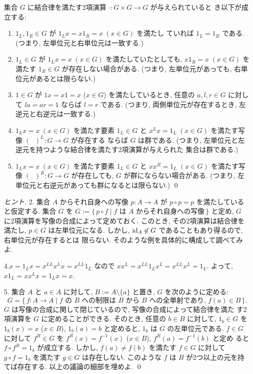 \documentclass[12pt,twoside]{jarticle}
\begin{document}

\begin{question}
  集合 $G$ に結合律を満たす2項演算 $\cdot:G\times G\to G$ が与えられていると
  き以下が成立する:
  \begin{enumerate}
  \item $1_L,1_R\in G$ が $1_Lx = x1_R = x\;(x\in G)$ を満たし
    ていれば $1_L=1_R$ である.  (つまり, 左単位元と右単位元は一致する.)
  \item $1_L\in G$ が $1_Lx = x\;(x\in G)$ を満たしていたとしても,
    $x1_R = x\;(x\in G)$ を満たす $1_R\in G$ が存在しない場合がある.
    (つまり, 左単位元があっても, 右単位元があるとは限らない.)
  \item $1\in G$ が $1x=x1=x$ ($x\in G$) を満たしているとき,
    任意の $a,l,r\in G$ に対して $la=ar=1$ ならば $l=r$ である. 
    (つまり, 両側単位元が存在するとき, 左逆元と右逆元は一致する.)
  \item $1_Lx=x\;(x\in G)$ を満たす要素 $1_L\in G$ と %
    $x^Lx=1_L\;(x\in G)$ を満たす写像 $(\;\;)^L:G\to G$ が存在する
    ならば $G$ は群である.
    (つまり, 左単位元と左逆元を持つような結合律を満たす2項演算が与えられた
    集合は群である.)
  \item $1_Lx=x\;(x\in G)$ を満たす要素 $1_L\in G$ と %
    $xx^R=1_L\;(x\in G)$ を満たす写像 $(\;\;)^R:G\to G$ が存在しても, 
    $G$ が群にならない場合がある.
    (つまり, 左単位元と右逆元があっても群になるとは限らない.)
    \qed
  \end{enumerate}
\end{question}

\begin{proof}[ヒント]
2. 集合 $A$ からそれ自身への写像 $p:A\to A$ が $p\circ p = p$ 
を満たしていると仮定する.  集合 $G$ 
を $G := \{\, p\circ f\mid \text{$f$ は $A$ からそれ自身への写像}\,\}$ と定め, %
$G$ に2項演算を写像の合成によって定めておく. 
このとき, その2項演算は結合律を満たし, $p\in G$ は左単位元になる.
しかし, $\mathop{\mathrm{id}}\nolimits_A\not\in G$ であることもあり得るので, 右単位元が存在するとは
限らない. そのような例を具体的に構成して調べてみよ.

4.$x=1_Lx=x^{LL}x^Lx=x^{LL}1_L$ なので $xx^L=x^{LL}1_Lx^L=x^{LL}x^L=1_L$. 
よって, $x1_L=xx^Lx=1_Lx=x$.

5. 集合 $A$ と $a\in A$ に対して, $B:=A\setminus\{a\}$ と置き,
$G$ を次のように定める:
\begin{equation*}
  G = \{\, f:A\to A \mid
  \text{$f$ の $B$ への制限は $B$ から $B$ への全単射であり, 
        $f(a)\in B$} \,\}.
\end{equation*}
$G$ は写像の合成に関して閉じているので, 写像の合成によって結合律を満た
す2項演算を $G$ に定めることができる.
そのとき, 任意の $b\in B$ に対して, 
$1_b\in G$ を $1_b(x)=x$ ($x\in B$), $1_b(a)=b$ と定めると, 
$1_b$ は $G$ の左単位元である. 
$f\in G$ に対して $f^R\in G$ を %
$f^R(x)=f^{-1}(x)$ ($x\in B$), $f^R(a)=f^{-1}(b)$ と定め
ると $f\circ f^R = 1_b$ が成立する. 
しかし, $f(a)\ne f(b)$ を満たす $f\in G$ に対して %
$g\circ f = 1_b$ を満たす $g\in G$ は存在しない.
このような $f$ は $B$ が2つ以上の元を持てば存在する.
以上の議論の細部を埋めよ.
\qed
\end{proof}
\end{document}
